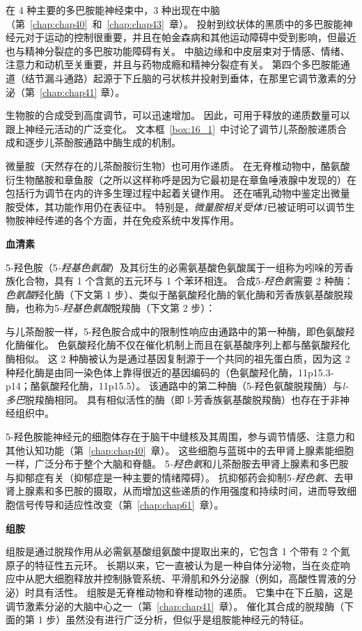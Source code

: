 在 4 种主要的多巴胺能神经束中，3 种出现在中脑（第~\ref{chap:chap40}~和~\ref{chap:chap43}~章）。
投射到纹状体的黑质中的多巴胺能神经元对于运动的控制很重要，并且在帕金森病和其他运动障碍中受到影响，但最近也与精神分裂症的多巴胺功能障碍有关。
中脑边缘和中皮层束对于情感、情绪、注意力和动机至关重要，并且与药物成瘾和精神分裂症有关。
第四个多巴胺能通道（结节漏斗通路）起源于下丘脑的弓状核并投射到垂体，在那里它调节激素的分泌（第~\ref{chap:chap41} 章）。


生物胺的合成受到高度调节，可以迅速增加。
因此，可用于释放的递质数量可以跟上神经元活动的广泛变化。
文本框~\ref{box:16_1}~中讨论了调节儿茶酚胺递质合成和逐步儿茶酚胺通路中酶生成的机制。


微量胺（天然存在的儿茶酚胺衍生物）也可用作递质。
在无脊椎动物中，酪氨酸衍生物酪胺和章鱼胺（之所以这样称呼是因为它最初是在章鱼唾液腺中发现的）在包括行为调节在内的许多生理过程中起着关键作用。
还在哺乳动物中鉴定出微量胺受体，其功能作用仍在表征中。
特别是，\textit{微量胺相关受体1}已被证明可以调节生物胺神经传递的各个方面，并在免疫系统中发挥作用。


\textbf{血清素}

5-羟色胺（5\textit{-羟基色氨酸}）及其衍生的必需氨基酸色氨酸属于一组称为吲哚的芳香族化合物，具有 1 个含氮的五元环与 1 个苯环相连。
合成5\textit{-羟色氨}需要 2 种酶：\textit{色氨酸}羟化酶（下文第 1 步）、类似于酪氨酸羟化酶的氧化酶和芳香族氨基酸脱羧酶，也称为5\textit{-羟基色氨酸}脱羧酶（下文第 2 步）：


与儿茶酚胺一样，5-羟色胺合成中的限制性响应由通路中的第一种酶，即色氨酸羟化酶催化。
色氨酸羟化酶不仅在催化机制上而且在氨基酸序列上都与酪氨酸羟化酶相似。
这 2 种酶被认为是通过基因复制源于一个共同的祖先蛋白质，因为这 2 种羟化酶是由同一染色体上靠得很近的基因编码的（色氨酸羟化酶，11p15.3-p14；酪氨酸羟化酶，11p15.5）。
该通路中的第二种酶（5-羟色氨酸脱羧酶）与\textit{l-多巴}脱羧酶相同。
具有相似活性的酶（即 l-芳香族氨基酸脱羧酶）也存在于非神经组织中。


5-羟色胺能神经元的细胞体存在于脑干中缝核及其周围，参与调节情感、注意力和其他认知功能（第~\ref{chap:chap40}~章）。
这些细胞与蓝斑中的去甲肾上腺素能细胞一样，广泛分布于整个大脑和脊髓。
5\textit{-羟色氨}和儿茶酚胺去甲肾上腺素和多巴胺与抑郁症有关（抑郁症是一种主要的情绪障碍）。
抗抑郁药会抑制5\textit{-羟色氨}、去甲肾上腺素和多巴胺的摄取，从而增加这些递质的作用强度和持续时间，进而导致细胞信号传导和适应性改变（第~\ref{chap:chap61}~章）。


\textbf{组胺}

组胺是通过脱羧作用从必需氨基酸组氨酸中提取出来的，它包含 1 个带有 2 个氮原子的特征性五元环。
长期以来，它一直被认为是一种自体分泌物，当在炎症响应中从肥大细胞释放并控制脉管系统、平滑肌和外分泌腺（例如，高酸性胃液的分泌）时具有活性。
组胺是无脊椎动物和脊椎动物的递质。
它集中在下丘脑，这是调节激素分泌的大脑中心之一（第~\ref{chap:chap41}~章）。
催化其合成的脱羧酶（下面的第 1 步）虽然没有进行广泛分析，但似乎是组胺能神经元的特征。


